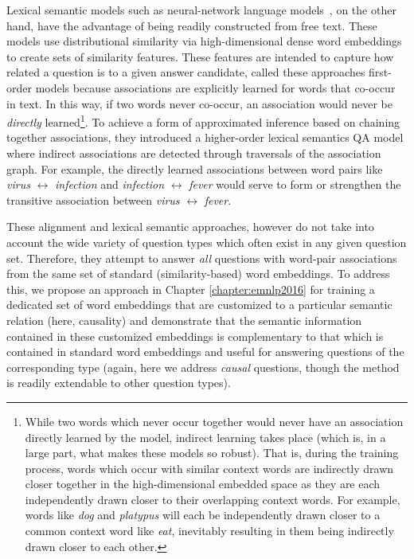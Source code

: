 Lexical semantic models such as neural-network language models~\citep{jansen14,sultan-etal:2014:TACL,yih13}, on the other hand, have the advantage of being readily constructed from free text.  These models use distributional similarity via high-dimensional dense word embeddings to create sets of similarity features.  These features are intended to capture how related a question is to a given answer candidate,   
\citet{fried2015higher} called these approaches first-order models because associations are explicitly learned for words that co-occur in text.  In this way, if two words never co-occur, an association would never be \emph{directly} learned\footnote{While two words which never occur together would never have an association directly learned by the model, indirect learning takes place (which is, in a large part, what makes these models so robust).  That is, during the training process, words which occur with similar context words are indirectly drawn closer together in the high-dimensional embedded space as they are each independently drawn closer to their overlapping context words.  For example, words like \emph{dog} and \emph{platypus} will each be independently drawn closer to a common context word like \emph{eat}, inevitably resulting in them being indirectly drawn closer to each other.}.   To achieve a form of approximated inference based on chaining together associations, they introduced a higher-order lexical semantics QA model where indirect associations are detected through traversals of the association graph.  For example, the directly learned associations between word pairs like \textit{virus} $\leftrightarrow$ \textit{infection} and \textit{infection} $\leftrightarrow$ \textit{fever} would serve to form or strengthen the transitive association between \textit{virus} $\leftrightarrow$ \textit{fever}. 

These alignment and lexical semantic approaches, however do not take into account the wide variety of question types which often exist in any given question set.  Therefore, they attempt to answer \emph{all} questions with word-pair associations from the same set of standard (similarity-based) word embeddings.  To address this, we propose an approach in Chapter \ref{chapter:emnlp2016} for training a dedicated set of word embeddings that are customized to a particular semantic relation (here, causality) and demonstrate that the semantic information contained in these customized embeddings is complementary to that which is contained in standard word embeddings and useful for answering questions of the corresponding type (again, here we address \textit{causal} questions, though the method is readily extendable to other question types).

